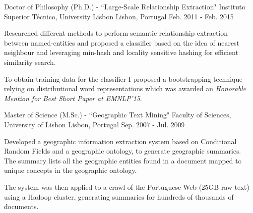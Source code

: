 

\begin{cventries}

  \cventry
    {Doctor of Philosophy (Ph.D.) - ``Large-Scale Relationship Extraction"} %
	{Instituto Superior Técnico, University Lisbon} %
    {Lisbon, Portugal} %
    {Feb. 2011 - Feb. 2015} %
    {
      \begin{cvitems} %
        \item {Researched different methods to perform semantic relationship extraction between named-entities and proposed a classifier based on the idea of nearest neighbour and leveraging min-hash and locality sensitive hashing for efficient similarity search.}
		\item {To obtain training data for the classifier I proposed a bootstrapping technique relying on distributional word representations which was awarded an {\it Honorable Mention for Best Short Paper at EMNLP'15}.}
      \end{cvitems}
    }


  \cventry
    {Master of Science (M.Sc.) - ``Geographic Text Mining"} %
	{Faculty of Sciences, University of Lisbon} %
    {Lisbon, Portugal} %
    {Sep. 2007 - Jul. 2009} %
    {
      \begin{cvitems} %
        \item {Developed a geographic information extraction system based on Conditional Random Fields and a geographic ontology, to generate geographic summaries. The summary lists all the geographic entities found in a document mapped to unique concepts in the geographic ontology.}
		\item {The system was then applied to a crawl of the Portuguese Web (25GB raw text) using a Hadoop cluster, generating summaries for hundreds of thousands of documents.}
      \end{cvitems}
    }


\end{cventries}
